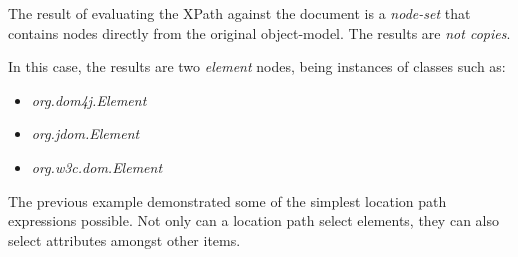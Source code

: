 \documentclass[20pt,landscape,headrule,footrule]{foils}
\begin{document}



\begin{codelisting}
\end{codelisting}



The result of evaluating the XPath against the document is a
\emph{node-set} that contains nodes directly from the original
object-model.  The results are \emph{not copies}.

In this case, the results are two \emph{element} nodes, being
instances of classes such as:

\begin{minipage}{\textwidth}
\small
\begin{itemize}
  \item \emph{org.dom4j.Element}
  \item \emph{org.jdom.Element}
  \item \emph{org.w3c.dom.Element}
\end{itemize}
\end{minipage}




The previous example demonstrated some of the simplest location
path expressions possible.  Not only can a location path select 
elements, they can also select attributes amongst other items.
\end{document}
